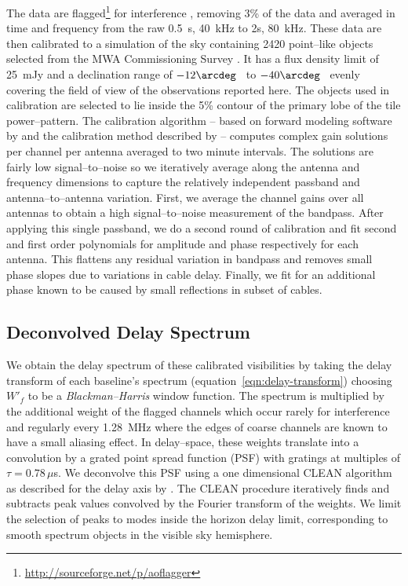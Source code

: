 \documentclass[preprint2,iop,numberedappendix]{emulateapj}
\begin{document}
The data are flagged\footnote{\url{http://sourceforge.net/p/aoflagger}} for interference \citep{off10,off12}, removing 3\% of the data and averaged in time  and frequency from the raw 0.5~s, 40~kHz to 2s, 80~kHz. These data are then calibrated to a simulation of the sky containing 2420 point--like objects selected from the MWA Commissioning Survey \citep[MWACS;][]{hur14}. It has a flux density limit of 25~mJy and a declination range of $-12\arcdeg$~ to $-40\arcdeg$~ evenly covering the field of view of the observations reported here. The objects used in calibration are selected to lie inside the 5\% contour of the primary lobe of the tile power--pattern. The calibration algorithm -- based on forward modeling software by \citet{sul12} and the calibration method described by \citet{sal14} -- computes complex gain solutions per channel per antenna averaged to two minute intervals. The solutions are fairly low signal--to--noise so we iteratively average along the antenna and frequency dimensions to capture the relatively independent passband and antenna--to--antenna variation. First, we average the channel gains over all antennas to obtain a high signal--to--noise measurement of the bandpass. After applying this single passband, we do a second round of calibration and fit second and first order polynomials for amplitude and phase respectively for each antenna. This flattens any residual variation in bandpass and removes small phase slopes due to variations in cable delay. Finally, we fit for an additional phase known to be caused by small reflections in subset of cables. 

\subsection{Deconvolved Delay Spectrum}\label{sec:data-delay-spectrum}

We obtain the delay spectrum of these calibrated visibilities by taking the delay transform of each baseline's spectrum (equation~\ref{eqn:delay-transform}) choosing $W'_f$ to be a {\it Blackman--Harris} window function. The spectrum is multiplied by the additional weight of the flagged channels which occur rarely for interference and regularly every 1.28~MHz where the edges of coarse channels are known to have a small aliasing effect. In delay--space, these weights translate into a convolution by a grated point spread function (PSF) with gratings at multiples of $\tau=0.78\,\mu$s. We deconvolve this PSF using a one dimensional CLEAN algorithm \citep{tay99} as described for the delay axis by \citet{par09,par12b}. The CLEAN procedure iteratively finds and subtracts peak values convolved by the Fourier transform of the weights. We limit the selection of peaks to modes inside the horizon delay limit, corresponding to smooth spectrum objects in the visible sky hemisphere. 
\end{document}
